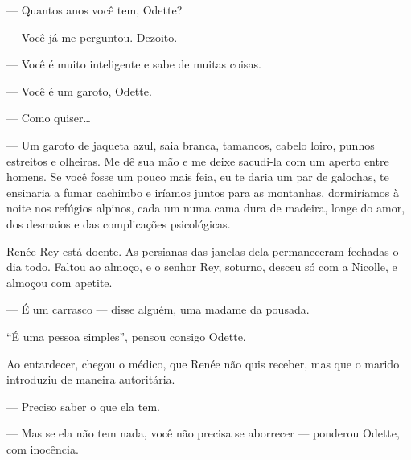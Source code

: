--- Quantos anos você tem, Odette?

--- Você já me perguntou. Dezoito.

--- Você é muito inteligente e sabe de muitas coisas.


--- Você é um garoto, Odette.

--- Como quiser\ldots{}

--- Um garoto de jaqueta azul, saia branca, tamancos, cabelo loiro,
punhos estreitos e olheiras. Me dê sua mão e me deixe sacudi-la com um
aperto entre homens. Se você fosse um pouco mais feia, eu te daria um
par de galochas, te ensinaria a fumar cachimbo e iríamos juntos para as
montanhas, dormiríamos à noite nos refúgios alpinos, cada um numa cama
dura de madeira, longe do amor, dos desmaios e das complicações
psicológicas.

\asterisc

Renée Rey está doente. As persianas das janelas dela permaneceram
fechadas o dia todo. Faltou ao almoço, e o senhor Rey, soturno, desceu
só com a Nicolle, e almoçou com apetite.

--- É um carrasco --- disse alguém, uma madame da pousada.

``É uma pessoa simples'', pensou consigo Odette.

Ao entardecer, chegou o médico, que Renée não quis receber, mas que o
marido introduziu de maneira autoritária.

--- Preciso saber o que ela tem.


--- Mas se ela não tem nada, você não precisa se aborrecer --- ponderou
Odette, com inocência.

